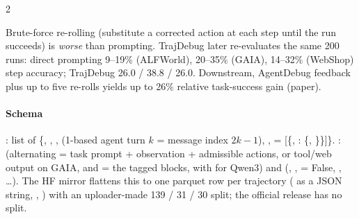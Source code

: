 \begin{multicols}{2}
\begin{center}\footnotesize\setlength{\tabcolsep}{2.5pt}
\end{center}
Brute-force re-rolling (substitute a corrected action at each step until the run succeeds) is \emph{worse} than prompting. TrajDebug later re-evaluates the same 200 runs: direct prompting 9--19\% (ALFWorld), 20--35\% (GAIA), 14--32\% (WebShop) step accuracy; TrajDebug 26.0 / 38.8 / 26.0. Downstream, AgentDebug feedback plus up to five re-rolls yields up to 26\% relative task-success gain (paper).

\paragraph{Schema} : list of \{, , ,  (1-based agent turn $k$ = message index $2k{-}1$), ,  = [\{, : \{, \}\}]\}. :  (alternating  = task prompt + observation + admissible actions, or tool/web output on GAIA, and  = the tagged blocks, with  for Qwen3) and  (, ,  = False, , \dots). The HF mirror flattens this to one parquet row per trajectory ( as a JSON string, , ) with an uploader-made 139 / 31 / 30 split; the official release has no split.
\end{multicols}

